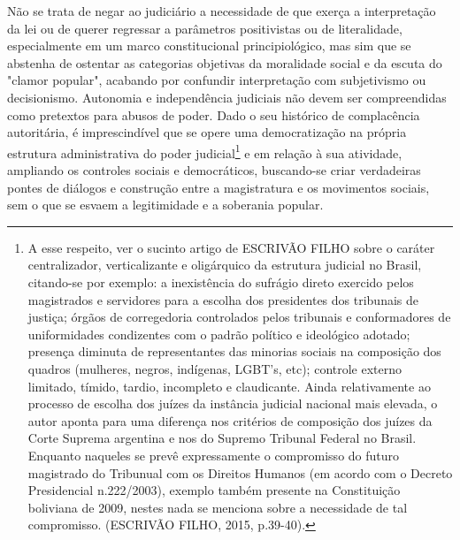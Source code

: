 Não se trata de negar ao judiciário a necessidade de que exerça a
interpretação da lei ou de querer regressar a parâmetros positivistas ou
de literalidade, especialmente em um marco constitucional
principiológico, mas sim que se abstenha de ostentar as categorias
objetivas da moralidade social e da escuta do "clamor popular", acabando
por confundir interpretação com subjetivismo ou decisionismo. Autonomia
e independência judiciais não devem ser compreendidas como pretextos
para abusos de poder. Dado o seu histórico de complacência autoritária,
é imprescindível que se opere uma democratização na própria estrutura
administrativa do poder judicial\footnote{A esse respeito, ver o sucinto
  artigo de ESCRIVÃO FILHO sobre o caráter centralizador, verticalizante
  e oligárquico da estrutura judicial no Brasil, citando-se por exemplo:
  a inexistência do sufrágio direto exercido pelos magistrados e
  servidores para a escolha dos presidentes dos tribunais de justiça;
  órgãos de corregedoria controlados pelos tribunais e conformadores de
  uniformidades condizentes com o padrão político e ideológico adotado;
  presença diminuta de representantes das minorias sociais na composição
  dos quadros (mulheres, negros, indígenas, LGBT's, etc); controle
  externo limitado, tímido, tardio, incompleto e claudicante. Ainda
  relativamente ao processo de escolha dos juízes da instância judicial
  nacional mais elevada, o autor aponta para uma diferença nos critérios
  de composição dos juízes da Corte Suprema argentina e nos do Supremo
  Tribunal Federal no Brasil. Enquanto naqueles se prevê expressamente o
  compromisso do futuro magistrado do Tribunual com os Direitos Humanos
  (em acordo com o Decreto Presidencial n.222/2003), exemplo também
  presente na Constituição boliviana de 2009, nestes nada se menciona
  sobre a necessidade de tal compromisso. (ESCRIVÃO FILHO, 2015,
  p.39-40).} e em relação à sua atividade, ampliando os controles
sociais e democráticos, buscando-se criar verdadeiras pontes de diálogos
e construção entre a magistratura e os movimentos sociais, sem o que se
esvaem a legitimidade e a soberania popular.

